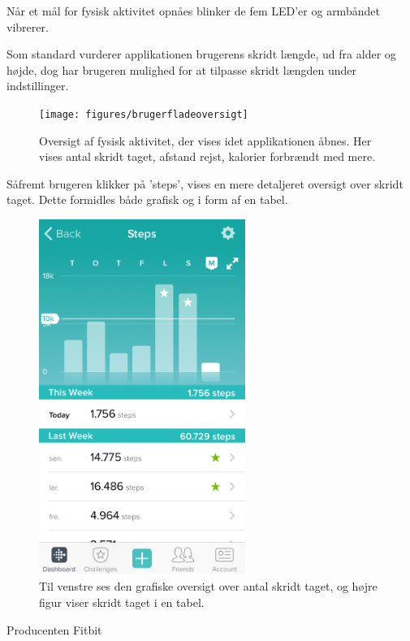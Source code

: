 Når et mål for fysisk aktivitet opnåes blinker de fem LED'er og armbåndet vibrerer. 

Som standard vurderer applikationen brugerens skridt længde, ud fra alder og højde, dog har brugeren mulighed for at tilpasse skridt længden under indstillinger.  

\begin{figure}[H]
	\centering
	\texttt{[image: figures/brugerfladeoversigt]}
	\caption{Oversigt af fysisk aktivitet, der vises idet applikationen åbnes. Her vises antal skridt taget, afstand rejst, kalorier forbrændt med mere.}
	\label{fig:brugerfladeoversigt}
\end{figure}


Såfremt brugeren klikker på 'steps', vises en mere detaljeret oversigt over skridt taget. Dette formidles både grafisk og i form af en tabel.

\begin{figure}[H]
	\centering
	\includegraphics[width=0.6\textwidth]{figures/brugerfladesteps}
	\caption{Til venstre ses den grafiske oversigt over antal skridt taget, og højre figur viser skridt taget i en tabel.}
	\label{fig:brugerfladesteps}
\end{figure}


 

Producenten Fitbit 			
			
